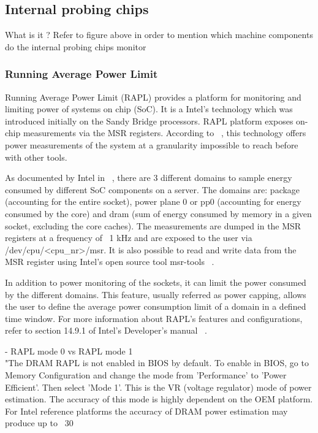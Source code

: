\documentclass[a4paper]{jpconf}
\begin{document}
\subsection{Internal probing chips}
What is it ? Refer to figure above in order to mention which machine components do the internal probing chips  monitor

\subsubsection{Running Average Power Limit}
Running Average Power Limit (RAPL) provides a platform for monitoring and limiting power of  systems on chip (SoC). It is a Intel's technology which was introduced initially on the Sandy Bridge processors. RAPL platform exposes on-chip measurements via the MSR registers. According to ~\cite{RAPL1}, this technology offers power measurements of the system at a granularity impossible to reach before with other tools.

As documented by Intel in ~\cite{INTELMAN}, there are 3 different domains to sample energy consumed by different SoC components on a server. The domains are: package (accounting for the entire socket), power plane 0 or pp0 (accounting for energy consumed by the core) and dram (sum of energy consumed by memory in a given socket, excluding the core caches). The measurements are dumped in the MSR registers at a frequency of ~1 kHz and are exposed to the user via /dev/cpu/<cpu\_nr>/msr. It is also possible to read and write data from the MSR register using Intel’s open source tool msr-tools ~\cite{MSRTOOLS}. 

In addition to power monitoring of the sockets, it can limit the power consumed by the different domains. This feature, usually referred as power capping, allows the user to define the average power consumption limit of a domain in a defined time window. For more information about RAPL’s features and configurations, refer to section 14.9.1 of Intel’s Developer’s manual ~\cite{INTELMAN}.

- RAPL mode 0 vs RAPL mode 1 \\
"The DRAM RAPL is not enabled in BIOS by default. To enable in BIOS, go to Memory Configuration and change the mode from 'Performance' to 'Power Efficient'. Then select 'Mode 1'. This is the VR (voltage regulator) mode of power estimation. The accuracy of this mode is highly dependent on the OEM platform. For Intel reference platforms the accuracy of DRAM power estimation may produce up to ~30%
\end{document}
